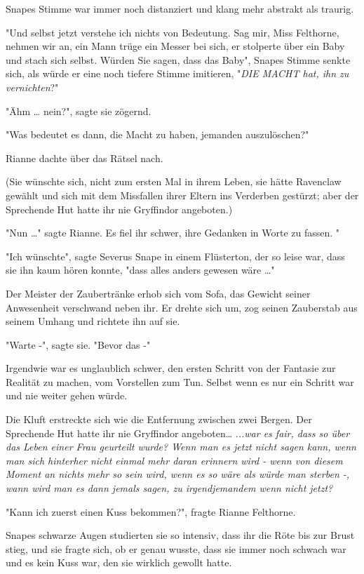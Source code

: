 {Snapes Stimme war immer noch distanziert und klang mehr abstrakt als traurig.

"Und selbst jetzt verstehe ich nichts von Bedeutung. Sag mir, Miss Felthorne, nehmen wir an, ein Mann trüge ein Messer bei sich, er stolperte über ein Baby und stach sich selbst. Würden Sie sagen, dass das Baby", Snapes Stimme senkte sich, als würde er eine noch tiefere Stimme imitieren, "\emph{DIE MACHT hat, ihn zu vernichten}?"

"Ähm … nein?", sagte sie zögernd.

"Was bedeutet es dann, die Macht zu haben, jemanden auszulöschen?"

Rianne dachte über das Rätsel nach.

(Sie wünschte sich, nicht zum ersten Mal in ihrem Leben, sie hätte Ravenclaw gewählt und sich mit dem Missfallen ihrer Eltern ins Verderben gestürzt; aber der Sprechende Hut hatte ihr nie Gryffindor angeboten.)

"Nun …" sagte Rianne. Es fiel ihr schwer, ihre Gedanken in Worte zu fassen. "

"Ich wünschte", sagte Severus Snape in einem Flüsterton, der so leise war, dass sie ihn kaum hören konnte, "dass alles anders gewesen wäre …"

Der Meister der Zaubertränke erhob sich vom Sofa, das Gewicht seiner Anwesenheit verschwand neben ihr. Er drehte sich um, zog seinen Zauberstab aus seinem Umhang und richtete ihn auf sie.

"Warte -", sagte sie. "Bevor das -"

Irgendwie war es unglaublich schwer, den ersten Schritt von der Fantasie zur Realität zu machen, vom Vorstellen zum Tun. Selbst wenn es nur ein Schritt war und nie weiter gehen würde.

Die Kluft erstreckte sich wie die Entfernung zwischen zwei Bergen. Der Sprechende Hut hatte ihr nie Gryffindor angeboten… .\emph{..war es fair, dass so über das Leben einer Frau geurteilt wurde? Wenn man es jetzt nicht sagen kann, wenn man sich hinterher nicht einmal mehr daran erinnern wird - wenn von diesem Moment an nichts mehr so sein wird, wenn es so wäre als würde man sterben -, wann wird man es dann jemals sagen, zu irgendjemandem wenn nicht jetzt?}

"Kann ich zuerst einen Kuss bekommen?", fragte Rianne Felthorne.

Snapes schwarze Augen studierten sie so intensiv, dass ihr die Röte bis zur Brust stieg, und sie fragte sich, ob er genau wusste, dass sie immer noch schwach war und es kein Kuss war, den sie wirklich gewollt hatte.

}
